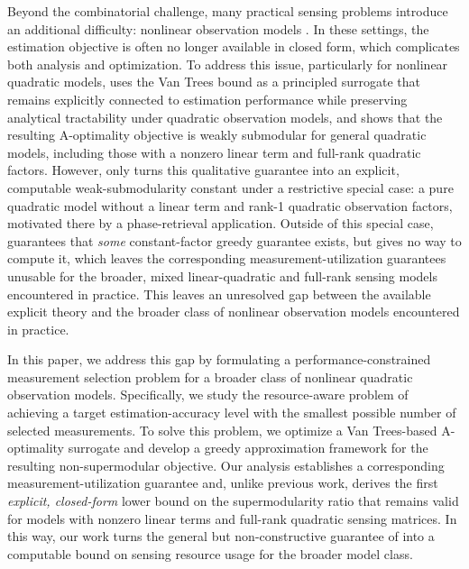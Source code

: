 \documentclass[letterpaper, 10 pt, conference]{ieeeconf}  %
\begin{document}
Beyond the combinatorial challenge, many practical sensing problems introduce an additional difficulty: nonlinear observation models \cite{c17,c18}. In these settings, the estimation objective is often no longer available in closed form, which complicates both analysis and optimization. To address this issue, particularly for nonlinear quadratic models, \cite{c19} uses the Van Trees bound as a principled surrogate that remains explicitly connected to estimation performance while preserving analytical tractability under quadratic observation models, and shows that the resulting A-optimality objective is weakly submodular for general quadratic models, including those with a nonzero linear term and full-rank quadratic factors. However, \cite{c19} only turns this qualitative guarantee into an explicit, computable weak-submodularity constant under a restrictive special case: a pure quadratic model without a linear term and rank-1 quadratic observation factors, motivated there by a phase-retrieval application. Outside of this special case, \cite{c19} guarantees that \emph{some} constant-factor greedy guarantee exists, but gives no way to compute it, which leaves the corresponding measurement-utilization guarantees unusable for the broader, mixed linear-quadratic and full-rank sensing models encountered in practice. This leaves an unresolved gap between the available explicit theory and the broader class of nonlinear observation models encountered in practice.

In this paper, we address this gap by formulating a performance-constrained measurement selection problem for a broader class of nonlinear quadratic observation models. Specifically, we study the resource-aware problem of achieving a target estimation-accuracy level with the smallest possible number of selected measurements. To solve this problem, we optimize a Van Trees-based A-optimality surrogate and develop a greedy approximation framework for the resulting non-supermodular objective. Our analysis establishes a corresponding measurement-utilization guarantee and, unlike previous work, derives the first \emph{explicit, closed-form} lower bound on the supermodularity ratio that remains valid for models with nonzero linear terms and full-rank quadratic sensing matrices. In this way, our work turns the general but non-constructive guarantee of \cite{c19} into a computable bound on sensing resource usage for the broader model class.
\end{document}
